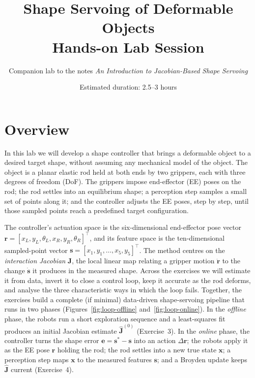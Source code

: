 \documentclass[11pt,a4paper]{article}
\title{\vspace{-2.2em}\textbf{\LARGE Shape Servoing of Deformable Objects}\\[0.3em]
\Large Hands-on Lab Session}
\author{Companion lab to the notes \emph{An Introduction to Jacobian-Based Shape Servoing}}
\date{Estimated duration: 2.5--3 hours}
\begin{document}
\maketitle
\vspace{-1em}

\section*{Overview}

In this lab we will develop a shape controller that brings a deformable object to a
desired target shape, without assuming any mechanical model of the object. The object is a
planar elastic rod held at both ends by two grippers, each with three degrees of freedom
(DoF). The grippers impose end-effector (EE) poses on the rod; the rod settles into an
equilibrium shape; a perception step samples a small set of points along it; and the
controller adjusts the EE poses, step by step, until those sampled points reach a predefined
target configuration.

The controller's actuation space is the six-dimensional end-effector pose vector
$\mathbf{r}=[x_L,y_L,\theta_L,x_R,y_R,\theta_R]^\top$, and its feature space is the
ten-dimensional sampled-point vector $\mathbf{s}=[x_1,y_1,\dots,x_5,y_5]^\top$. The method
centres on the \emph{interaction Jacobian} $\mathbf{J}$, the local linear map relating a
gripper motion $\dot{\mathbf{r}}$ to the change $\dot{\mathbf{s}}$ it produces in the measured shape. Across the exercises we will
estimate it from data, invert it to close a control loop, keep it accurate as the rod
deforms, and analyse the three characteristic ways in which the loop fails. Together, the
exercises build a complete (if minimal) data-driven shape-servoing pipeline that runs in
two phases (Figures~\ref{fig:loop-offline} and~\ref{fig:loop-online}). In the
\emph{offline} phase, the robots run a short exploration sequence and a least-squares fit
produces an initial Jacobian estimate $\hat{\mathbf{J}}^{(0)}$ (Exercise~3). In the \emph{online}
phase, the controller turns the shape error $\mathbf{e}=\mathbf{s}^{*}-\mathbf{s}$ into an action $\Delta\mathbf{r}$; the
robots apply it as the EE pose $\mathbf{r}$ holding the rod; the rod settles into a new true state
$\mathbf{x}$; a perception step maps $\mathbf{x}$ to the measured features $\mathbf{s}$; and a Broyden update keeps
$\hat{\mathbf{J}}$ current (Exercise~4).
\end{document}
